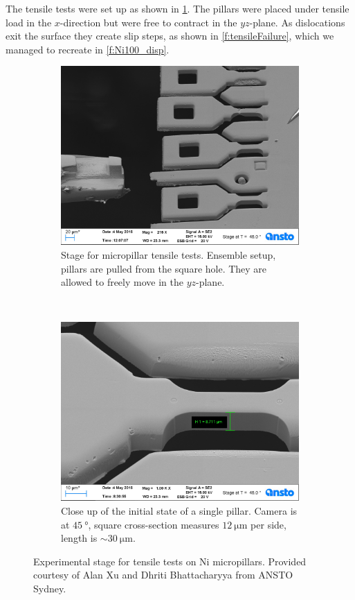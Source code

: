 The tensile tests were set up as shown in \cref{f:expSetup}. The pillars were placed under tensile load in the $x$-direction but were free to contract in the $yz$-plane. As dislocations exit the surface they create slip steps, as shown in \cref{f:tensileFailure}, which we managed to recreate in \cref{f:Ni100_disp}.
\begin{figure}
    \centering
    \begin{subfigure}[t]{0.45\linewidth}
        \includegraphics[width=\linewidth]{../data/Ni024.jpg}
        \caption[Stage for micropillar tensile tests.]{Stage for micropillar tensile tests. Ensemble setup, pillars are pulled from the square hole. They are allowed to freely move in the $yz$-plane.}
    \end{subfigure}
    ~
    \begin{subfigure}[t]{0.45\linewidth}
        \centering
        \includegraphics[width=\linewidth]{../data/Ni000.jpg}
        \caption[Close up of the initial state of a single pillar.]{Close up of the initial state of a single pillar. Camera is at $\SI{45}{\degree}$, square cross-section measures $\SI{12}{\micro\metre}$ per side, length is $\sim \SI{30}{\micro\metre}$.}
    \end{subfigure}
    \caption{Experimental stage for tensile tests on Ni micropillars. Provided courtesy of Alan Xu and Dhriti Bhattacharyya from ANSTO Sydney.}
    \label{f:expSetup}
\end{figure}
